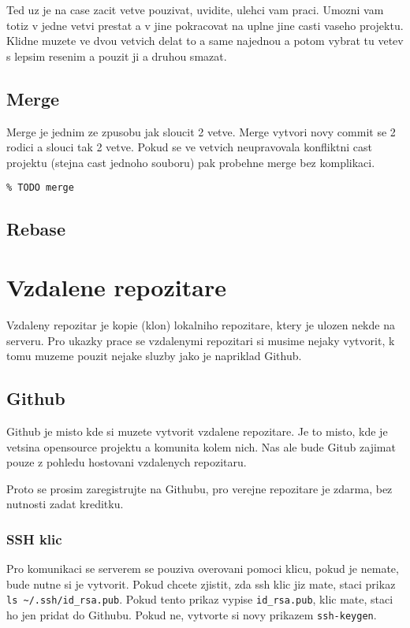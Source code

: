 \documentclass[12pt,a5paper]{article}
\begin{document}
Ted uz je na case zacit vetve pouzivat, uvidite, ulehci vam praci. Umozni vam totiz v jedne vetvi prestat a v jine pokracovat na uplne jine casti vaseho projektu. Klidne muzete ve dvou vetvich delat to a same najednou a potom vybrat tu vetev s lepsim resenim a pouzit ji a druhou smazat.


\subsection{Merge}

Merge je jednim ze zpusobu jak sloucit 2 vetve. Merge vytvori novy commit se 2 rodici a slouci tak 2 vetve. Pokud se ve vetvich neupravovala konfliktni cast projektu (stejna cast jednoho souboru) pak probehne merge bez komplikaci.

\begin{lstlisting}
% TODO merge
\end{lstlisting}


\subsection{Rebase}
\section{Vzdalene repozitare}

Vzdaleny repozitar je kopie (klon) lokalniho repozitare, ktery je ulozen nekde na serveru. Pro ukazky prace se vzdalenymi repozitari si musime nejaky vytvorit, k tomu muzeme pouzit nejake sluzby jako je napriklad Github.

\subsection{Github}

Github je misto kde si muzete vytvorit vzdalene repozitare. Je to misto, kde je vetsina opensource projektu a komunita kolem nich. Nas ale bude Gitub zajimat pouze z pohledu hostovani vzdalenych repozitaru.

Proto se prosim zaregistrujte na Githubu, pro verejne repozitare je zdarma, bez nutnosti zadat kreditku.

\subsubsection{SSH klic}

Pro komunikaci se serverem se pouziva overovani pomoci klicu, pokud je nemate, bude nutne si je vytvorit. Pokud chcete zjistit, zda ssh klic jiz mate, staci prikaz \lstinline|ls ~/.ssh/id_rsa.pub|. Pokud tento prikaz vypise \lstinline|id_rsa.pub|, klic mate, staci ho jen pridat do Githubu. Pokud ne, vytvorte si novy prikazem \lstinline|ssh-keygen|.
\end{document}
